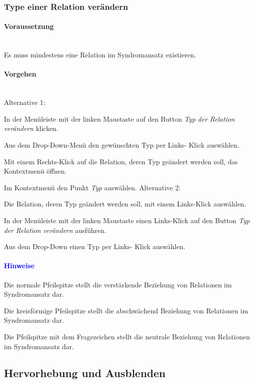 \documentclass[enabledeprecatedfontcommands,fontsize=11pt,paper=a4,twoside]{scrartcl}
\newcounter{one}
\newcounter{two}[one]
\newcommand*{\hint}{\paragraph{\textcolor{blue}{Hinweise}}}
\newcommand*{\condition}{\paragraph{Voraussetzung}$\;$ \vspace{0.2cm}\\}
\newcommand*{\actions}{\paragraph{Vorgehen} $\;$\vspace{0.2cm}\\}
\newcommand*{\aOne}{\textcolor{bbe}{Alternative 1:}}
\newcommand*{\aTwo}{\textcolor{bbe}{Alternative 2:}}
\let\tempone\itemize
\let\temptwo\enditemize
\renewenvironment{itemize}{\tempone\addtolength{\itemsep}{-10.0pt}}{\temptwo}
\let\origenumerate\enumerate
\let\origendenumerate\endenumerate
\renewenvironment{enumerate}{\origenumerate \addtolength{\itemsep}{-10.0pt}}{\origendenumerate}
\begin{document}
\subsubsection{Type einer Relation verändern}
		\condition
		Es muss mindestens eine Relation im Syndromansatz existieren.
		\actions
		\aOne
		\begin{enumerate}
			\item In der Menüleiste mit der linken Maustaste auf den Button \textit{Typ der Relation verändern} klicken.
			\item Aus dem Drop-Down-Menü den gewünschten Typ per Links- Klick auswählen.
			\item Mit einem Rechts-Klick auf die Relation, deren Typ geändert werden soll, das Kontextmenü öffnen.
			\item Im Kontextmenü den Punkt \textit{Typ} auswählen.
		\end{enumerate}
		\aTwo
		\begin{enumerate}
			\item Die Relation, deren Typ geändert werden soll, mit einem Links-Klick auswählen.
			\item In der Menüleiste mit der linken Maustaste einen Links-Klick auf den Button \textit{Typ der Relation verändern} ausführen.
			\item Aus dem Drop-Down einen Typ per Links- Klick auswählen. 
		\end{enumerate}	
		\hint
		\begin{itemize}
			\item Die normale Pfeilspitze stellt die verstärkende Beziehung von Relationen im Syndromansatz dar.
			\item Die kreisförmige Pfeilspitze stellt die abschwächend Beziehung von Relationen im Syndromansatz dar.
			\item Die Pfeilspitze mit dem Fragezeichen stellt die neutrale Beziehung von Relationen im Syndromansatz dar.
		\end{itemize}
		
	\subsection{Hervorhebung und Ausblenden} \label{highlight}
\end{document}
